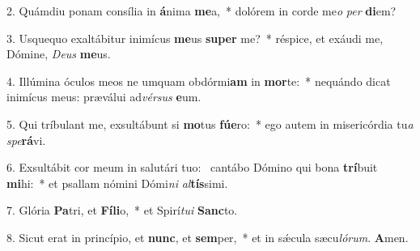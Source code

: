 2. Quámdiu ponam consília in \textbf{á}nima \textbf{me}a,~*  dolórem in corde me\textit{o} \textit{per} \textbf{di}em?\

3. Usquequo exaltábitur inimícus \textbf{me}us \textbf{su}\textbf{per} me?~*  réspice, et exáudi me, Dómine, \textit{De}\textit{us} \textbf{me}us.\

4. Illúmina óculos meos ne umquam obdórmi\textbf{am} in \textbf{mor}te:~*  nequándo dicat inimícus meus: præválui ad\textit{vér}\textit{sus} \textbf{e}um.\

5. Qui tríbulant me, exsultábunt si \textbf{mo}tus \textbf{fú}\textbf{e}ro:~*  ego autem in misericórdia tu\textit{a} \textit{spe}\textbf{rá}vi.\

6. Exsultábit cor meum in salutári tuo: \dag\  cantábo Dómino qui bona \textbf{trí}buit \textbf{mi}hi:~*  et psallam nómini Dómi\textit{ni} \textit{al}\textbf{tís}simi.\

7. Glória \textbf{Pa}tri, et \textbf{Fí}\textbf{li}o,~*  et Spirí\textit{tu}\textit{i} \textbf{Sanc}to.\

8. Sicut erat in princípio, et \textbf{nunc}, et \textbf{sem}per,~*  et in sǽcula sæcu\textit{ló}\textit{rum}. \textbf{A}men.\

